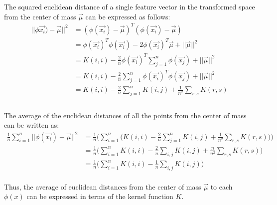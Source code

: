 \documentclass{article}
\begin{document}
The squared euclidean distance of a single feature vector in the transformed space from the center of mass $\vec{\mu}$ can be expressed as follows:
\\
\begin{equation*}
\begin{split}
||\phi\vec{x_{i}}) - \vec{\mu}||^2 &= (\phi(\vec{x_{i}}) - \vec{\mu})^T(\phi(\vec{x_{i}}) - \vec{\mu}) \\
&= \phi(\vec{x_{i}})^T\phi(\vec{x_{i}}) - 2\phi(\vec{x_{i}})^T\vec{\mu} + ||\vec{\mu}||^2 \\
&= K(i,i) - \frac{2}{n}\phi(\vec{x_{i}})^T \sum_{j=1}^{n} \phi(\vec{x_{j}}) + || \vec{\mu}||^2 \\
&= K(i,i) - \frac{2}{n} \sum_{j=1}^{n} \phi(\vec{x_{i}})^T \phi(\vec{x_{j}}) + || \vec{\mu}||^2 \\
&= K(i,i) - \frac{2}{n} \sum_{j=1}^{n} K(i,j) + \frac{1}{n^2}\sum_{r,s} K(r,s) \\
\end{split}
\end{equation*}
\\
The average of the euclidean distances of all the points from the center of mass can be written as:
\\
\begin{equation*}
\begin{split}
\frac{1}{n} \sum_{i=1}^{n} ||\phi(\vec{x_{i}})-\vec{\mu}||^2 &= \frac{1}{n} \Bigg(\sum_{i=1}^{n} \bigg( K(i,i) - \frac{2}{n} \sum_{j=1}^{n} K(i,j) + \frac{1}{n^2} \sum_{r,s} K(r,s) \bigg) \Bigg)  \\
&= \frac{1}{n}\bigg( \sum_{i=1}^{n} K(i,i) - \frac{2}{n} \sum_{i,j} K(i,j) +\frac{n}{n^2} \sum_{r,s} K(r,s) \bigg) \\
&= \frac{1}{n} \bigg( \sum_{i=1}^{n} K(i,i) - \frac{1}{n} \sum_{i,j} K(i,j) \bigg) 
\end{split}
\end{equation*}
\\
Thus, the average of euclidean distances from the center of mass $\vec{\mu}$ to each $\phi(x)$ can be expressed in terms of the kernel function $K$.
\end{document}
